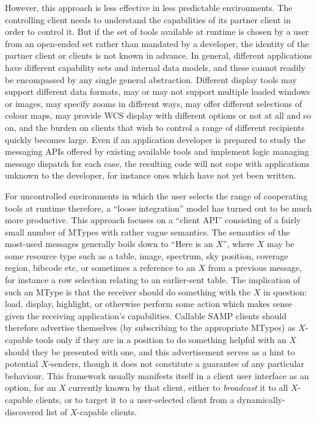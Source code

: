 \documentclass[5p]{elsarticle}
\begin{document}
However, this approach is less effective in less predictable environments.
The controlling client needs to understand
the capabilities of its partner client in order to control it.
But if the set of tools available at runtime is chosen by a
user from an open-ended set
rather than mandated by a developer, the identity of the
partner client or clients is not known in advance.
In general, different applications have different capability sets
and internal data models, and these cannot readily be encompassed
by any single general abstraction.
Different display tools may support different data formats,
may or may not support multiple loaded windows or images,
may specify zooms in different ways,
may offer different selections of colour maps,
may provide WCS display with different options or not at all
and so on,
and the burden on clients that wish to control a range
of different recipients quickly becomes large.
Even if an application developer is prepared to study the
messaging APIs offered by existing available tools and implement logic
managing message dispatch for each case,
the resulting code will not cope with applications
unknown to the developer,
for instance ones which have not yet been written.

For uncontrolled environments in which the user selects
the range of cooperating tools at runtime therefore,
a ``loose integration'' model has turned out to be much more productive.
This approach focuses on a ``client API''
consisting of a fairly small number of MTypes with rather vague semantics.
The semantics of the most-used messages generally boils down to
``Here is an $X$'', where $X$ may be some resource type such as a
table, image, spectrum,
sky position, coverage region, bibcode etc,
or sometimes a reference to an $X$ from a previous message,
for instance a row selection relating to an earlier-sent table.
The implication of such an MType is that the receiver should do
something with the $X$ in question: load, display, highlight,
or otherwise perform some action which makes sense given the
receiving application's capabilities.
Callable SAMP clients should therefore advertise themselves
(by subscribing to the appropriate MTypes) as $X$-capable
tools only if they are in a position to do something helpful
with an $X$ should they be presented with one,
and this advertisement serves as a hint to potential $X$-senders,
though it does not constitute a guarantee of any particular behaviour.
This framework usually manifests itself in a client user interface
as an option, for an $X$ currently known by that client,
either to {\em broadcast\/} it to all $X$-capable clients,
or to target it to a user-selected client
from a dynamically-discovered list of $X$-capable clients.
\end{document}

